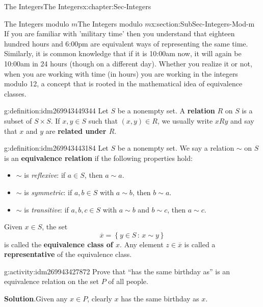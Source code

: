 \documentclass[oneside,10pt,]{book}
\newcommand{\terminology}[1]{\textbf{#1}}
\numberwithin{equation}{section}
\newcommand{\setof}[2]{{\left\{#1\,\colon\,#2\right\}}}
\begin{document}
\begin{chapterptx}{The Integers}{}{The Integers}{}{}{x:chapter:Sec-Integers}
%
\begin{sectionptx}{The Integers modulo \(m\)}{}{The Integers modulo \(m\)}{}{}{x:section:SubSec-Integers-Mod-m}
If you are familiar with 'military time' then you understand that eighteen hundred hours and 6:00pm are equivalent ways of representing the same time. Similarly, it is common knowledge that if it is 10:00am now, it will again be 10:00am in 24 hours (though on a different day). Whether you realize it or not, when you are working with time (in hours) you are working in the integers modulo 12, a concept that is rooted in the mathematical idea of equivalence classes.%
\begin{definition}{}{g:definition:idm269943449344}%
Let \(S\) be a nonempty set. A \terminology{relation} \(R\) on \(S\) is a subset of \(S\times S\). If \(x,y\in S\) such that \((x,y)\in R\), we usually write \(xRy\) and say that \(x\) and \(y\) are \terminology{related under \(R\)}.%
\end{definition}
\begin{definition}{}{g:definition:idm269943443184}%
Let \(S\) be a nonempty set. We say a relation \(\sim\) on \(S\) is an \terminology{equivalence relation} if the following properties hold:%
\begin{itemize}[label=\textbullet]
\item{}\(\sim\) is \emph{reflexive}: if \(a\in S\), then \(a\sim a\).%
\item{}\(\sim\) is \emph{symmetric}: if \(a,b\in S\) with \(a\sim b\), then \(b\sim a\).%
\item{}\(\sim\) is \emph{transitive}: if \(a,b,c\in S\) with \(a\sim b\) and \(b\sim c\), then \(a\sim c\).%
\end{itemize}
%
\par
Given \(x\in S\), the set%
\begin{equation*}
\overline{x} = \setof{y\in S}{x\sim y}
\end{equation*}
is called the \terminology{equivalence class of \(x\)}. Any element \(z\in \overline{x}\) is called a \terminology{representative} of the equivalence class.%
\end{definition}
\begin{activity}{}{g:activity:idm269943427872}%
Prove that ``has the same birthday as'' is an equivalence relation on the set \(P\) of all people.%
\par\smallskip%
\noindent\textbf{Solution}.\hypertarget{g:solution:idm269943425824}{}\quad{}Given any \(x\in P\), clearly \(x\) has the same birthday as \(x\).%
\par

\end{activity}
\end{sectionptx}
\end{chapterptx}
\end{document}
